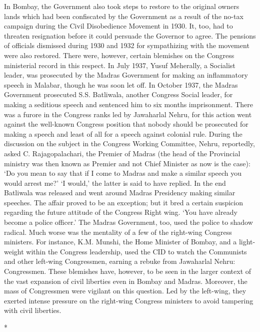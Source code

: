 \begin{multicols}{2}
In Bombay, the Government also took steps to restore to the original owners lands which had been confiscated by the Government as a result of the no-tax campaign during the Civil Disobedience Movement in 1930. It, too, had to threaten resignation before it could persuade the Governor to agree. The pensions of officials dismissed during 1930 and 1932 for sympathizing with the movement were also restored. There were, however, certain blemishes on the Congress ministerial record in this respect. In July 1937, Yusuf Meherally, a Socialist leader, was prosecuted by the Madras Government for making an inflammatory speech in Malabar, though he was soon let off. In October 1937, the Madras Government prosecuted S.S. Batliwala, another Congress Social leader, for making a seditious speech and sentenced him to six months imprisonment. There was a furore in the Congress ranks led by Jawaharlal Nehru, for this action went against the well-known Congress position that nobody should be prosecuted for making a speech and least of all for a speech against colonial rule. During the discussion on the subject in the Congress Working Committee, Nehru, reportedly, asked C. Rajagopalachari, the Premier of Madras (the head of the Provincial ministry was then known as Premier and not Chief Minister as now is the case): `Do you mean to say that if I come to Madras and make a similar speech you would arrest me?' `I would,' the latter is said to have replied. In the end Batliwala was released and went around Madras Presidency making similar speeches. The affair proved to be an exception; but it bred a certain suspicion regarding the future attitude of the Congress Right wing. `You have already become a police officer.' The Madras Government, too, used the police to shadow radical. Much worse was the mentality of a few of the right-wing Congress ministers. For instance, K.M. Munshi, the Home Minister of Bombay, and a light-weight within the Congress leadership, used the CID to watch the Communists and other left-wing Congressmen, earning a rebuke from Jawaharlal Nehru: Congressmen. These blemishes have, however, to be seen in the larger context of the vast expansion of civil liberties even in Bombay and Madras. Moreover, the mass of Congressmen were vigilant on this question. Led by the left-wing, they exerted intense pressure on the right-wing Congress ministers to avoid tampering with civil liberties.

\begin{center}*\end{center}


\end{multicols}
